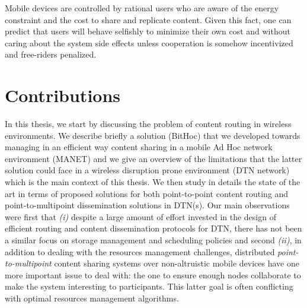 Mobile devices are controlled by rational users who are aware of the energy constraint and the cost to share and replicate content. Given this fact, one can predict that users will behave selfishly to minimize their own cost and without caring about the system side effects unless cooperation is somehow incentivized and free-riders penalized. 

\section{Contributions}

In this thesis, we start by discussing the problem of content routing in wireless environments. We describe briefly a solution (BitHoc) that we developed towards managing in an efficient way content sharing in a mobile Ad Hoc network environment (MANET) and we give an overview of the limitations that the latter solution could face in a wireless disruption prone environment (DTN network) which is the main context of this thesis. We then study in details the state of the art in terms of proposed solutions for both point-to-point content routing and point-to-multipoint dissemination solutions in DTN(s). Our main observations were first that \emph{(i)} despite a large amount of effort invested in the design of efficient routing and content dissemination protocols for DTN, there has not been a similar focus on storage management and scheduling policies and second \emph{(ii)}, in addition to dealing with the resources management challenges, distributed \emph{point-to-multipoint} content sharing systems over non-altruistic mobile devices have one more important issue to deal with: the one to ensure enough nodes collaborate to make the system interesting to participants. This latter goal is often conflicting with optimal resources management algorithms. 

